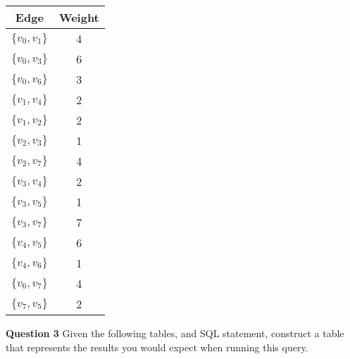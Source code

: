\documentclass{letter}
\begin{document}
\begin{tabular}{ c | c }
Edge & Weight \\ \hline
$\{ v_0, v_1 \}$ & 4 \\
$\{ v_0, v_3 \}$ & 6 \\
$\{ v_0, v_6 \}$ & 3 \\
$\{ v_1, v_4 \}$ & 2 \\
$\{ v_1, v_2 \}$ & 2 \\
$\{ v_2, v_3 \}$ & 1 \\
$\{ v_2, v_7 \}$ & 4 \\
$\{ v_3, v_4 \}$ & 2 \\
$\{ v_3, v_5 \}$ & 1 \\
$\{ v_3, v_7 \}$ & 7 \\
$\{ v_4, v_5 \}$ & 6 \\
$\{ v_4, v_6 \}$ & 1 \\
$\{ v_6, v_7 \}$ & 4 \\
$\{ v_7, v_5 \}$ & 2 \\
\end{tabular}

\clearpage

{\bf Question 3} \kern 1cm Given the following tables, and SQL statement,
construct a table that represents the results you would expect when running
this query.
\end{document}
